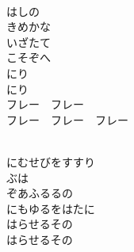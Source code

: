 \documentclass[10pt,b5j]{tarticle} %
\begin{document}
\vspace{1.5em} %
\newcommand{\linespace}{0.5em} %
\newcommand{\blocksize}{0.5\hsize} %
\newcommand{\itemmargin}{3em} %
\begin{enumerate} %
    \setlength{\itemindent}{\itemmargin} %
    \begin{minipage}[c]{\blocksize}
    
        \vspace{\linespace}
        \item~\\
        はしの\\
        きめかな\\
        いざたて\\
        こそぞへ\\
        にり\\
        にり\\
        フレー　フレー\\
        フレー　フレー　フレー
        
    \end{minipage}
    \begin{minipage}[c]{\blocksize}
        
        \vspace{\linespace}
        \item~\\
        にむせびをすすり\\
        ぶは\\
        ぞあふるるの\\
        にもゆるをはたに\\
        はらせるその\\
        はらせるその
        

\end{minipage}
\end{enumerate}
\end{document}
